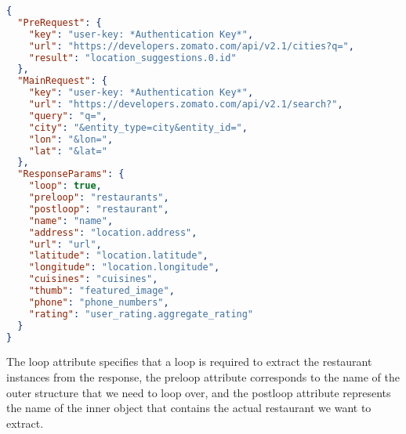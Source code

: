 \begin{lstlisting}[language=json,firstnumber=1]
{
  "PreRequest": {
    "key": "user-key: *Authentication Key*",
    "url": "https://developers.zomato.com/api/v2.1/cities?q=",
    "result": "location_suggestions.0.id"
  },
  "MainRequest": {
    "key": "user-key: *Authentication Key*",
    "url": "https://developers.zomato.com/api/v2.1/search?",
    "query": "q=",
    "city": "&entity_type=city&entity_id=",
    "lon": "&lon=",
    "lat": "&lat="
  },
  "ResponseParams": {
    "loop": true,
    "preloop": "restaurants",
    "postloop": "restaurant",
    "name": "name",
    "address": "location.address",
    "url": "url",
    "latitude": "location.latitude",
    "longitude": "location.longitude",
    "cuisines": "cuisines",
    "thumb": "featured_image",
    "phone": "phone_numbers",
    "rating": "user_rating.aggregate_rating"
  }
}
\end{lstlisting}
The loop attribute specifies that a loop is required to extract the restaurant instances from the response, the preloop attribute corresponds to the name of the outer structure that we need to loop over, and the postloop attribute represents the name of the inner object that contains the actual restaurant we want to extract.
